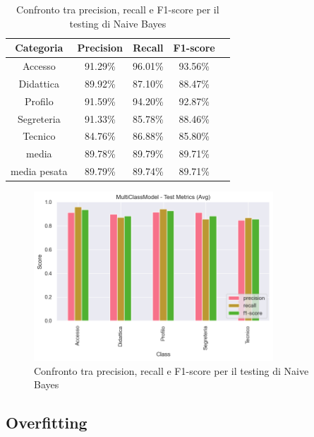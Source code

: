 \begin{table}[H]
    \centering
    \begin{tabular}{|c|c|c|c|c|}
        \hline
        \textbf{Categoria} & \textbf{Precision} & \textbf{Recall} & \textbf{F1-score} \\
        \hline
        Accesso & 91.29\% & 96.01\% & 93.56\% \\
        \hline
        Didattica & 89.92\% & 87.10\% & 88.47\% \\
        \hline
        Profilo & 91.59\% & 94.20\% & 92.87\% \\
        \hline
        Segreteria & 91.33\% & 85.78\% & 88.46\% \\
        \hline
        Tecnico & 84.76\% & 86.88\% & 85.80\% \\
        \hline
        media & 89.78\% & 89.79\% & 89.71\% \\
        \hline
        media pesata & 89.79\% & 89.74\% & 89.71\% \\
        \hline
    \end{tabular}
    \caption{Confronto tra precision, recall e F1-score per il testing di Naive Bayes}
    \label{tab:metriche_naive_bayes_test}
\end{table}

\begin{figure}[H]
    \centering
    \includegraphics[width=0.8\textwidth]{images/metrics_test_naive_bayes.png}
    \caption{Confronto tra precision, recall e F1-score per il testing di Naive Bayes}
    \label{fig:metrics_test_naive_bayes}
\end{figure}

\subsection{Overfitting}

